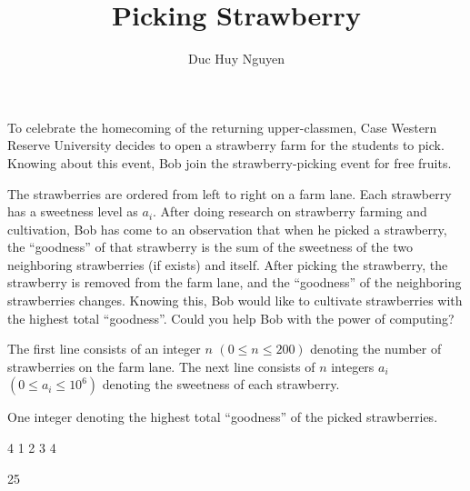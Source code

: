 \documentclass{article}
\title{Picking Strawberry}
\author{Duc Huy Nguyen}
\begin{document}
\begin{problemDescription}
    To celebrate the homecoming of the returning upper-classmen, Case Western Reserve University decides to open a strawberry farm for the students to pick. Knowing about this event, Bob join the strawberry-picking event for free fruits.

The strawberries are ordered from left to right on a farm lane. Each strawberry has a sweetness level as $a_i$. After doing research on strawberry farming and cultivation, Bob has come to an observation that when he picked a strawberry, the “goodness” of that strawberry is the sum of the sweetness of the two neighboring strawberries (if exists) and itself. After picking the strawberry, the strawberry is removed from the farm lane, and the “goodness” of the neighboring strawberries changes. Knowing this, Bob would like to cultivate strawberries with the highest total “goodness”. Could you help Bob with the power of computing?

\end{problemDescription}

\begin{inputDescription}

    The first line consists of an integer $n$ $(0 \leq n \leq 200)$ denoting the number of strawberries on the farm lane.
    The next line consists of $n$ integers $a_i$ $(0 \leq a_i \leq 10^6)$ denoting the sweetness of each strawberry.
    

\end{inputDescription}

\begin{outputDescription}
    One integer denoting the highest total “goodness” of the picked strawberries.
\end{outputDescription}

\begin{sampleInput}
4
1 2 3 4
\end{sampleInput}
\begin{sampleOutput}
25
\end{sampleOutput}
\end{document}
